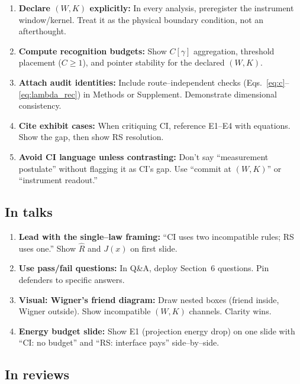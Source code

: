 \documentclass[11pt]{article}
\begin{document}
\begin{enumerate}[leftmargin=*]
  \item \textbf{Declare $(W,K)$ explicitly:} In every analysis, preregister the instrument window/kernel. Treat it as the physical boundary condition, not an afterthought.
  
  \item \textbf{Compute recognition budgets:} Show $C[\gamma]$ aggregation, threshold placement ($C\ge 1$), and pointer stability for the declared $(W,K)$.
  
  \item \textbf{Attach audit identities:} Include route--independent checks (Eqs.~\ref{eq:c}--\ref{eq:lambda_rec}) in Methods or Supplement. Demonstrate dimensional consistency.
  
  \item \textbf{Cite exhibit cases:} When critiquing CI, reference E1--E4 with equations. Show the gap, then show RS resolution.
  
  \item \textbf{Avoid CI language unless contrasting:} Don't say ``measurement postulate'' without flagging it as CI's gap. Use ``commit at $(W,K)$'' or ``instrument readout.''
\end{enumerate}

\subsection{In talks}

\begin{enumerate}[leftmargin=*]
  \item \textbf{Lead with the single--law framing:} ``CI uses two incompatible rules; RS uses one.'' Show $\hat R$ and $J(x)$ on first slide.
  
  \item \textbf{Use pass/fail questions:} In Q\&A, deploy Section~6 questions. Pin defenders to specific answers.
  
  \item \textbf{Visual: Wigner's friend diagram:} Draw nested boxes (friend inside, Wigner outside). Show incompatible $(W,K)$ channels. Clarity wins.
  
  \item \textbf{Energy budget slide:} Show E1 (projection energy drop) on one slide with ``CI: no budget'' and ``RS: interface pays'' side--by--side.
\end{enumerate}

\subsection{In reviews}
\end{document}

